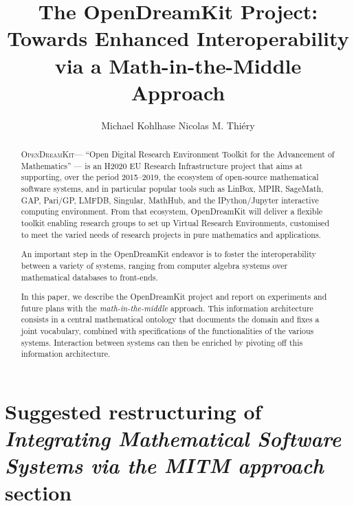 \documentclass{llncs}
\title{The OpenDreamKit Project:\\
  Towards Enhanced Interoperability\\
  via a Math-in-the-Middle Approach}
\author{Michael Kohlhase\inst{1} Nicolas M. Thi\'ery\inst{2} }
\institute{Jacobs University, Bremen, Germany \and Universit\'e Paris-Sud, Paris, France}
\newcommand{\software}[1]{\textsc{#1}\xspace}
\newcommand{\ODK}{\software{OpenDreamKit}}
\begin{document}
\maketitle
\begin{abstract}
  \ODK --- ``Open Digital Research Environment Toolkit for the
  Advancement of Mathematics'' --- is an H2020 EU Research
  Infrastructure project that aims at supporting, over the period
  2015--2019, the ecosystem of open-source mathematical software
  systems, and in particular popular tools such as LinBox, MPIR,
  SageMath, GAP, Pari/GP, LMFDB, Singular, MathHub, and the
  IPython/Jupyter interactive computing environment. From that
  ecosystem, OpenDreamKit will deliver a flexible toolkit enabling
  research groups to set up Virtual Research Environments, customised
  to meet the varied needs of research projects in pure mathematics
  and applications.

  An important step in the OpenDreamKit endeavor is to foster the
  interoperability between a variety of systems, ranging from computer
  algebra systems over mathematical databases to front-ends.

  In this paper, we describe the OpenDreamKit project and report on experiments and future
  plans with the \emph{math-in-the-middle} approach.  This information architecture
  consists in a central mathematical ontology that documents the domain and fixes a joint
  vocabulary, combined with specifications of the functionalities of the various
  systems. Interaction between systems can then be enriched by pivoting off this
  information architecture.
\end{abstract}

\section{Suggested restructuring of \emph{Integrating Mathematical Software Systems via the MITM approach} section}
\end{document}

